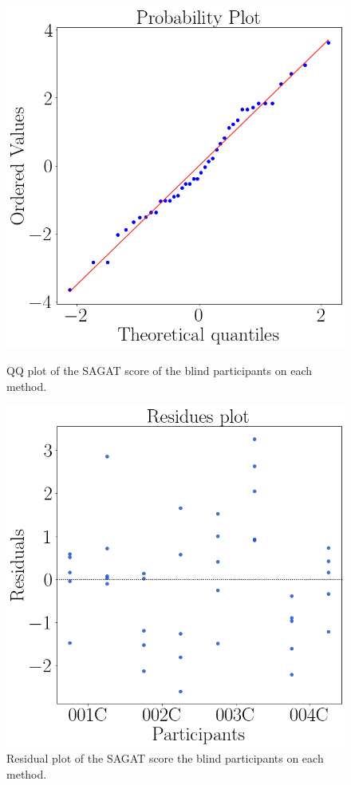 \begin{figure}[!htb]
    \centering
    \begin{minipage}{0.45\textwidth}
        \centering
        \includegraphics[width = 0.8\linewidth]{Resultados/Sagat/Figuras/png/qqplot_sagat_avg_two_way_blind.png}
        \caption{QQ plot of the SAGAT score of the blind participants on each method.}
        \label{fig:qqplot_sagat_avg_two_way_blind}
    \end{minipage}
    \begin{minipage}{0.45\textwidth}
        \centering
        \includegraphics[width = 0.8\linewidth]{Resultados/Sagat/Figuras/png/residplot_sagat_avg_two_way_blind.png}
        \caption{Residual plot of the SAGAT score the blind participants on each method.}
        \label{fig:residplot_sagat_avg_two_way_blind}
    \end{minipage}
\end{figure}


